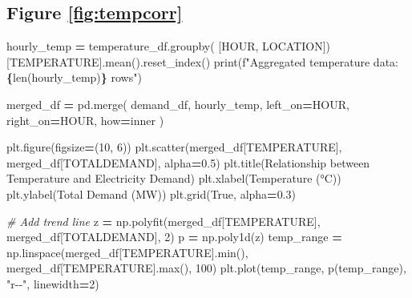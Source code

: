 \documentclass[mstat,12pt]{unswthesis}
\newenvironment{Shaded}{\begin{snugshade}}{\end{snugshade}}
\newcommand{\BuiltInTok}[1]{#1}
\newcommand{\CommentTok}[1]{\textcolor[rgb]{0.56,0.35,0.01}{\textit{#1}}}
\newcommand{\DecValTok}[1]{\textcolor[rgb]{0.00,0.00,0.81}{#1}}
\newcommand{\FloatTok}[1]{\textcolor[rgb]{0.00,0.00,0.81}{#1}}
\newcommand{\NormalTok}[1]{#1}
\newcommand{\OperatorTok}[1]{\textcolor[rgb]{0.81,0.36,0.00}{\textbf{#1}}}
\newcommand{\SpecialCharTok}[1]{\textcolor[rgb]{0.81,0.36,0.00}{\textbf{#1}}}
\newcommand{\SpecialStringTok}[1]{\textcolor[rgb]{0.31,0.60,0.02}{#1}}
\newcommand{\StringTok}[1]{\textcolor[rgb]{0.31,0.60,0.02}{#1}}
\newcommand{\VariableTok}[1]{\textcolor[rgb]{0.00,0.00,0.00}{#1}}
\begin{document}
\subsection*{Figure \ref{fig:tempcorr}}\label{figure-reffigtempcorr}

\begin{Shaded}
\begin{Highlighting}[]
\NormalTok{hourly\_temp }\OperatorTok{=}\NormalTok{ temperature\_df.groupby(}
\NormalTok{      [}\StringTok{\textquotesingle{}HOUR\textquotesingle{}}\NormalTok{, }\StringTok{\textquotesingle{}LOCATION\textquotesingle{}}\NormalTok{])[}\StringTok{\textquotesingle{}TEMPERATURE\textquotesingle{}}\NormalTok{].mean().reset\_index()}
\BuiltInTok{print}\NormalTok{(}\SpecialStringTok{f"Aggregated temperature data: }\SpecialCharTok{\{}\BuiltInTok{len}\NormalTok{(hourly\_temp)}\SpecialCharTok{\}}\SpecialStringTok{ rows"}\NormalTok{)}

\NormalTok{merged\_df }\OperatorTok{=}\NormalTok{ pd.merge(}
\NormalTok{    demand\_df,}
\NormalTok{    hourly\_temp,}
\NormalTok{    left\_on}\OperatorTok{=}\StringTok{\textquotesingle{}HOUR\textquotesingle{}}\NormalTok{,}
\NormalTok{    right\_on}\OperatorTok{=}\StringTok{\textquotesingle{}HOUR\textquotesingle{}}\NormalTok{,}
\NormalTok{    how}\OperatorTok{=}\StringTok{\textquotesingle{}inner\textquotesingle{}}
\NormalTok{)}


\NormalTok{plt.figure(figsize}\OperatorTok{=}\NormalTok{(}\DecValTok{10}\NormalTok{, }\DecValTok{6}\NormalTok{))}
\NormalTok{plt.scatter(merged\_df[}\StringTok{\textquotesingle{}TEMPERATURE\textquotesingle{}}\NormalTok{], merged\_df[}\StringTok{\textquotesingle{}TOTALDEMAND\textquotesingle{}}\NormalTok{], }
\NormalTok{  alpha}\OperatorTok{=}\FloatTok{0.5}\NormalTok{)}
\NormalTok{plt.title(}\StringTok{\textquotesingle{}Relationship between Temperature and Electricity Demand\textquotesingle{}}\NormalTok{)}
\NormalTok{plt.xlabel(}\StringTok{\textquotesingle{}Temperature (°C)\textquotesingle{}}\NormalTok{)}
\NormalTok{plt.ylabel(}\StringTok{\textquotesingle{}Total Demand (MW)\textquotesingle{}}\NormalTok{)}
\NormalTok{plt.grid(}\VariableTok{True}\NormalTok{, alpha}\OperatorTok{=}\FloatTok{0.3}\NormalTok{)}

\CommentTok{\# Add trend line}
\NormalTok{z }\OperatorTok{=}\NormalTok{ np.polyfit(merged\_df[}\StringTok{\textquotesingle{}TEMPERATURE\textquotesingle{}}\NormalTok{], merged\_df[}\StringTok{\textquotesingle{}TOTALDEMAND\textquotesingle{}}\NormalTok{], }\DecValTok{2}\NormalTok{)}
\NormalTok{p }\OperatorTok{=}\NormalTok{ np.poly1d(z)}
\NormalTok{temp\_range }\OperatorTok{=}\NormalTok{ np.linspace(merged\_df[}\StringTok{\textquotesingle{}TEMPERATURE\textquotesingle{}}\NormalTok{].}\BuiltInTok{min}\NormalTok{(), }
\NormalTok{    merged\_df[}\StringTok{\textquotesingle{}TEMPERATURE\textquotesingle{}}\NormalTok{].}\BuiltInTok{max}\NormalTok{(), }\DecValTok{100}\NormalTok{)}
\NormalTok{plt.plot(temp\_range, p(temp\_range), }\StringTok{"r{-}{-}"}\NormalTok{, linewidth}\OperatorTok{=}\DecValTok{2}\NormalTok{)}


\end{Highlighting}
\end{Shaded}
\end{document}
